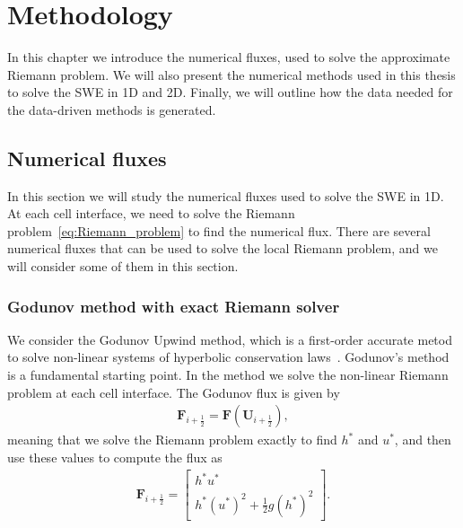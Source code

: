 \chapter{Methodology}
In this chapter we introduce the numerical fluxes, used to solve the approximate Riemann problem.
We will also present the numerical methods used in this thesis to solve the SWE in 1D and 2D.
Finally, we will outline how the data needed for the data-driven methods is generated.

\section{Numerical fluxes}
In this section we will study the numerical fluxes used to solve the SWE in 1D.
At each cell interface, we need to solve the Riemann problem~\eqref{eq:Riemann_problem} to find the numerical flux.
There are several numerical fluxes that can be used to solve the local Riemann problem, and we will consider some of them in this section.

\subsection*{Godunov method with exact Riemann solver}
We consider the Godunov Upwind method, which is a first-order accurate metod to solve non-linear systems of hyperbolic conservation laws~\cite{Toro2024}.
Godunov's method is a fundamental starting point.
In the method we solve the non-linear Riemann problem at each cell interface.
The Godunov flux is given by
\begin{align*}
    \mathbf{F}_{i + \frac{1}{2}} = \mathbf{F}(\mathbf{U}_{i + \frac{1}{2}}),
\end{align*}
meaning that we solve the Riemann problem exactly to find $h^*$ and $u^*$, and then use these values to compute the flux as 
\begin{align*}
    \mathbf{F}_{i + \frac{1}{2}} = \begin{bmatrix}
        h^* u^* \\ h^* {(u^{*})}^2 + \frac{1}{2} g {(h^{*})}^2
    \end{bmatrix}.
\end{align*}

